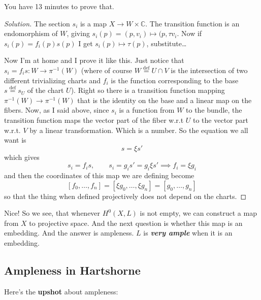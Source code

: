 \begin{exercise}\leavevmode
You have 13 minutes to prove that.
\end{exercise}

\begin{proof}[Solution]\leavevmode
The section \(s_i\) is a map \(X \to W \times \mathbb{C}\). The transition function is an endomorphism of \(W\), giving \(s_i(p)=(p,v_i) \mapsto  (p, \tau v_i\). Now if \(s_i(p)=f_i(p)s(p)\) I get
\(s_i(p)\mapsto  \tau(p)\), substitute…

Now I'm at home and I prove it like this. Just notice that \(s_i=f_is:W \to \pi^{-1}(W)\) (where of course \(W\overset{\operatorname{def}}{=}U \cap V\) is the intersection of two different trivializing charts and \(f_i\) is the function corresponding to the base \(s\overset{\operatorname{def}}{=}s_U\) of the chart \(U\)). Right so there is a transition function mapping \(\pi^{-1}(W) \to \pi^{-1}(W)\) that is the identity on the base and a linear map on the fibers. Now, as I said above, since \(s_i\) is a function from \(W\) to the bundle, the transition function maps the vector part of the fiber w.r.t \(U\) to the vector part w.r.t. \(V\) by a linear transformation. Which is a number. So the equation we all want is
\[s=\xi s'\]
which gives
\[s_i=f_is,\qquad s_i=g_is'=g_i\xi s' \implies f_i=\xi g_i\]
and then the coordinates of this map we are defining become
\[[f_0,\ldots,f_n]=[\xi g_0,\ldots,\xi g_n]=[g_0,\ldots,g_n]\]
so that the thing when defined projectively does not depend on the charts.
\end{proof}

Nice! So we see, that whenever \(H^{0}(X,L)\) is not empty, we can construct a map from \(X\) to projective space. And the next question is whether this map is an embedding. And the answer is ampleness. \(L\) is \textit{\textbf{very  ample}} when it is an embedding.

\subsection{Ampleness in Hartshorne}

Here's the \textbf{upshot} about ampleness:

